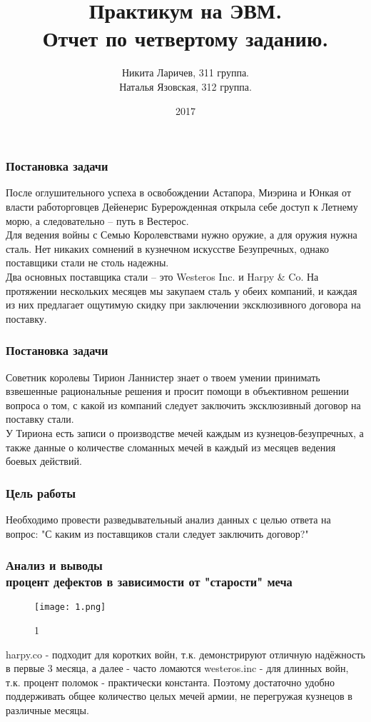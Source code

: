 \documentclass[8pt]{beamer}
\title{Практикум на ЭВМ.\\ Отчет по четвертому заданию.}
\author{ Никита Ларичев, 311 группа.\\ Наталья Язовская, 312 группа.}
\institute{МГУ имени М.В. Ломоносова, Москва, Россия}
\date{2017}
\begin{document}
 
\frame{\titlepage}
 
\begin{frame}
\frametitle{Постановка задачи}
После оглушительного успеха в освобождении Астапора, Миэрина и Юнкая от власти работорговцев Дейенерис Бурерожденная открыла себе доступ к Летнему морю, а следовательно -- путь в Вестерос.\\
Для ведения войны с Семью Королевствами нужно оружие, а для оружия нужна сталь. Нет никаких сомнений в кузнечном искусстве Безупречных, однако поставщики стали не столь надежны.\\
Два основных поставщика стали -- это {Westeros Inc.} и {Harpy \& Co}. На протяжении нескольких месяцев мы закупаем сталь у обеих компаний, и каждая из них предлагает ощутимую скидку при заключении эксклюзивного договора на поставку.\\
\end{frame}

\begin{frame}
\frametitle{Постановка задачи}
Советник королевы Тирион Ланнистер знает о твоем умении принимать взвешенные рациональные решения и просит помощи в объективном решении вопроса о том, с какой из компаний следует заключить эксклюзивный договор на поставку стали.\\
У Тириона есть записи о производстве мечей каждым из кузнецов-безупречных, а также данные о количестве сломанных мечей в каждый из месяцев ведения боевых действий.\\
\end{frame}
 
\begin{frame}
\frametitle{Цель работы}
Необходимо провести разведывательный анализ данных с целью ответа на вопрос: "С каким из поставщиков стали следует заключить договор?"
\end{frame}

\begin{frame}
\frametitle{Анализ и выводы\\{ процент дефектов в зависимости от "старости" меча}}
\begin{figure}[h]
		\texttt{[image: 1.png]}
		\caption{1}
		\label{First}
\end{figure}
harpy.co - подходит для коротких войн, т.к. демонстрируют отличную надёжность в первые 3 месяца, а далее - часто ломаются
westeros.inc - для длинных войн, т.к. процент поломок - практически константа. Поэтому достаточно удобно поддерживать общее количество целых мечей армии, не перегружая кузнецов в различные месяцы.
\end{frame}
\end{document}
